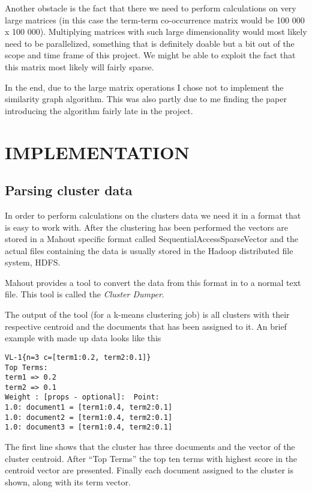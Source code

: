 \documentclass[letterpaper, 10 pt, conference]{ieeeconf}
\begin{document}
Another obstacle is the fact that there we need to perform calculations on very
large matrices (in this case the term-term co-occurrence matrix would be 100 000
x 100 000). Multiplying matrices with such large dimensionality would most
likely need to be parallelized, something that is definitely doable but a bit
out of the scope and time frame of this project. We might be able to exploit the
fact that this matrix most likely will fairly sparse.

In the end, due to the large matrix operations I chose not to implement the
similarity graph algorithm. This was also partly due to me finding the paper
introducing the algorithm fairly late in the project.

\section{IMPLEMENTATION}

\subsection{Parsing cluster data}
In order to perform calculations on the clusters data we need it in a format
that is easy to work with. After the clustering has been performed the vectors
are stored in a Mahout specific format called SequentialAccessSparseVector and
the actual files containing the data is usually stored in the Hadoop distributed
file system, HDFS.

Mahout provides a tool to convert the data from this format in to a normal text
file. This tool is called the \textit{Cluster Dumper}.\cite{clusterdumper}

The output of the tool (for a k-means clustering job) is all clusters with their
respective centroid and the documents that has been assigned to it. An brief
example with made up data looks like this

\begin{verbatim}
VL-1{n=3 c=[term1:0.2, term2:0.1]}
Top Terms:
term1 => 0.2
term2 => 0.1
Weight : [props - optional]:  Point:
1.0: document1 = [term1:0.4, term2:0.1]
1.0: document2 = [term1:0.4, term2:0.1]
1.0: document3 = [term1:0.4, term2:0.1]
\end{verbatim}

The first line shows that the cluster has three documents and the vector of the
cluster centroid. After ``Top Terms'' the top ten terms with highest score in
the centroid vector are presented. Finally each document assigned to the cluster
is shown, along with its term vector.
\end{document}
